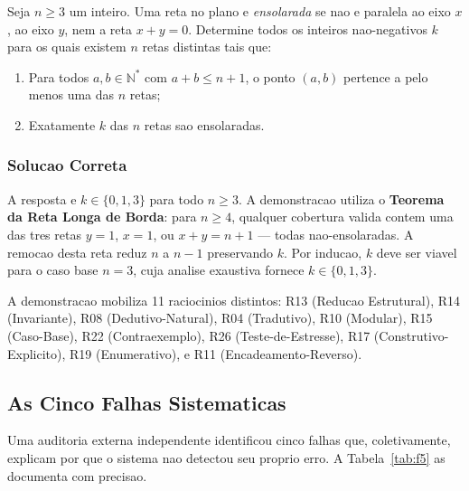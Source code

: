 \documentclass[5p]{elsarticle}
\newcommand{\N}{\mathbb{N}}
\begin{document}
Seja $n\geq 3$ um inteiro. Uma reta no plano e \textit{ensolarada} se nao e
paralela ao eixo $x$, ao eixo $y$, nem a reta $x+y=0$. Determine todos os
inteiros nao-negativos $k$ para os quais existem $n$ retas distintas tais que:

\begin{enumerate}[label=(\roman*)]
  \item Para todos $a,b\in\N^*$ com $a+b\leq n+1$, o ponto $(a,b)$ pertence a
    pelo menos uma das $n$ retas;
  \item Exatamente $k$ das $n$ retas sao ensolaradas.
\end{enumerate}

\subsubsection{Solucao Correta}

A resposta e $k\in\{0,1,3\}$ para todo $n\geq 3$. A demonstracao \cite{chen2025}
utiliza o \textbf{Teorema da Reta Longa de Borda}: para $n\geq 4$, qualquer
cobertura valida contem uma das tres retas $y=1$, $x=1$, ou $x+y=n+1$ --- todas
nao-ensolaradas. A remocao desta reta reduz $n$ a $n-1$ preservando $k$. Por
inducao, $k$ deve ser viavel para o caso base $n=3$, cuja analise exaustiva
fornece $k\in\{0,1,3\}$.

A demonstracao mobiliza 11 raciocinios distintos: R13 (Reducao Estrutural),
R14 (Invariante), R08 (Dedutivo-Natural), R04 (Tradutivo), R10 (Modular),
R15 (Caso-Base), R22 (Contraexemplo), R26 (Teste-de-Estresse), R17
(Construtivo-Explicito), R19 (Enumerativo), e R11 (Encadeamento-Reverso).

\subsection{As Cinco Falhas Sistematicas}

Uma auditoria externa independente \cite{corrigendum2026} identificou cinco
falhas que, coletivamente, explicam por que o sistema nao detectou seu proprio
erro. A Tabela~\ref{tab:f5} as documenta com precisao.
\end{document}
